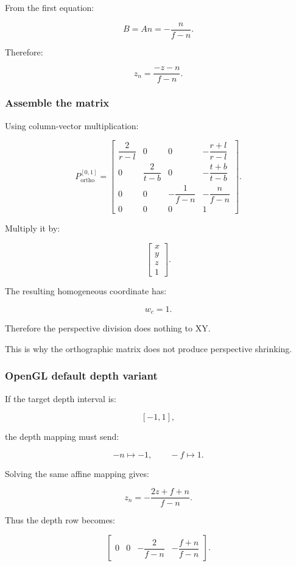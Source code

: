 From the first equation:

\[
 B=An=-\frac n{f-n}.
\]

Therefore:

\[
 \boxed{ z_n=\frac{-z-n}{f-n} }.
\]

\subsubsection{Assemble the matrix}\label{assemble-the-matrix}

Using column-vector multiplication:

\[
 \boxed{ P_{\mathrm{ortho}}^{[0,1]}= \begin{bmatrix} \dfrac2{r-l}&0&0&-\dfrac{r+l}{r-l}\\ 0&\dfrac2{t-b}&0&-\dfrac{t+b}{t-b}\\ 0&0&-\dfrac1{f-n}&-\dfrac n{f-n}\\ 0&0&0&1 \end{bmatrix} }.
\]

Multiply it by:

\[
 \begin{bmatrix}x\\y\\z\\1\end{bmatrix}.
\]

The resulting homogeneous coordinate has:

\[
 w_c=1.
\]

Therefore the perspective division does nothing to XY.

This is why the orthographic matrix does not produce perspective shrinking.

\subsubsection{OpenGL default depth variant}\label{opengl-default-depth-variant}

If the target depth interval is:

\[
 [-1,1],
\]

the depth mapping must send:

\[
 -n\mapsto-1, \qquad -f\mapsto1.
\]

Solving the same affine mapping gives:

\[
 \boxed{ z_n= -\frac{2z+f+n}{f-n} }.
\]

Thus the depth row becomes:

\[
 \begin{bmatrix} 0&0&-\dfrac2{f-n}&-\dfrac{f+n}{f-n} \end{bmatrix}.
\]

